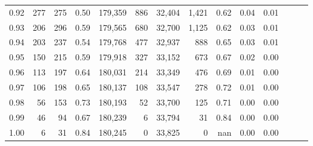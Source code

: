 \begin{tabular}{rrrrrrrrrrrrrr}
0.92 &    277 &  275 &  0.50 &  179,359 &      886 &  32,404 &   1,421 &  0.62 &  0.04 &      0.01 \\
0.93 &    206 &  296 &  0.59 &  179,565 &      680 &  32,700 &   1,125 &  0.62 &  0.03 &      0.01 \\
0.94 &    203 &  237 &  0.54 &  179,768 &      477 &  32,937 &     888 &  0.65 &  0.03 &      0.01 \\
0.95 &    150 &  215 &  0.59 &  179,918 &      327 &  33,152 &     673 &  0.67 &  0.02 &      0.00 \\
0.96 &    113 &  197 &  0.64 &  180,031 &      214 &  33,349 &     476 &  0.69 &  0.01 &      0.00 \\
0.97 &    106 &  198 &  0.65 &  180,137 &      108 &  33,547 &     278 &  0.72 &  0.01 &      0.00 \\
0.98 &     56 &  153 &  0.73 &  180,193 &       52 &  33,700 &     125 &  0.71 &  0.00 &      0.00 \\
0.99 &     46 &   94 &  0.67 &  180,239 &        6 &  33,794 &      31 &  0.84 &  0.00 &      0.00 \\
1.00 &      6 &   31 &  0.84 &  180,245 &        0 &  33,825 &       0 &   nan &  0.00 &      0.00 \\
\bottomrule
\end{tabular}
